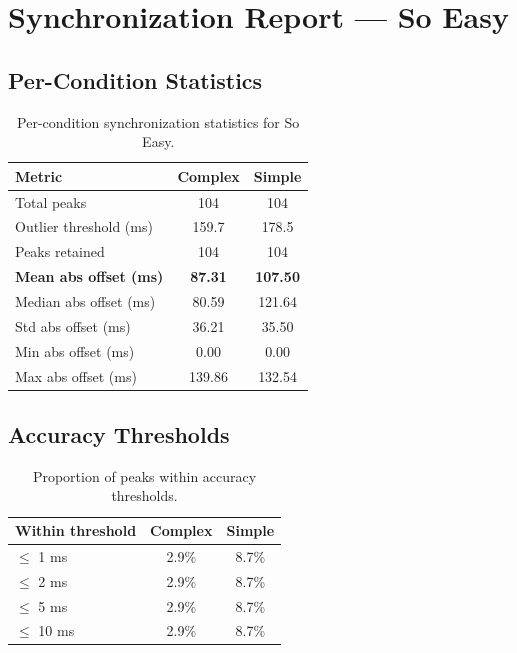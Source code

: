 
\section*{Synchronization Report --- So Easy}

\subsection*{Per-Condition Statistics}

\begin{table}[h!]
\centering
\begin{tabular}{|l|c|c|}
\hline
Metric & Complex & Simple \\
\hline
Total peaks & 104 & 104 \\
Outlier threshold (ms) & 159.7 & 178.5 \\
Peaks retained & 104 & 104 \\
\textbf{Mean abs offset (ms)} & \textbf{87.31} & \textbf{107.50} \\
Median abs offset (ms) & 80.59 & 121.64 \\
Std abs offset (ms) & 36.21 & 35.50 \\
Min abs offset (ms) & 0.00 & 0.00 \\
Max abs offset (ms) & 139.86 & 132.54 \\
\hline
\end{tabular}
\caption{Per-condition synchronization statistics for So Easy.}
\label{tab:sync_stats}
\end{table}

\subsection*{Accuracy Thresholds}

\begin{table}[h!]
\centering
\begin{tabular}{|l|c|c|}
\hline
Within threshold & Complex & Simple \\
\hline
$\leq$ 1 ms & 2.9\% & 8.7\% \\
$\leq$ 2 ms & 2.9\% & 8.7\% \\
$\leq$ 5 ms & 2.9\% & 8.7\% \\
$\leq$ 10 ms & 2.9\% & 8.7\% \\
\hline
\end{tabular}
\caption{Proportion of peaks within accuracy thresholds.}
\label{tab:sync_accuracy}
\end{table}

